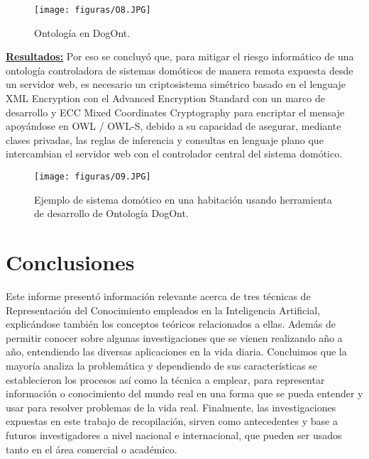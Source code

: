 \documentclass[10pt,conference]{IEEEtran}
\begin{document}
\begin{enumerate}
\begin{figure}[H]
 \begin{center}
       \texttt{[image: figuras/O8.JPG]}
      \caption{Ontología en DogOnt.}
      \label{fO8} 
      \end{center}
\end{figure}
\textbf{\underline{Resultados:}}
Por eso se concluyó que, para mitigar el riesgo informático de una ontología controladora de sistemas domóticos de manera remota expuesta desde un servidor web, es necesario un criptosistema simétrico basado en el lenguaje XML Encryption con el Advanced Encryption Standard con un marco de desarrollo y ECC Mixed Coordinates Cryptography para encriptar el mensaje apoyándose en OWL / OWL-S, debido a su capacidad de asegurar, mediante clases privadas, las reglas de inferencia y consultas en lenguaje plano que intercambian el servidor web con el controlador central del sistema domótico.

\begin{figure}[H]
 \begin{center}
       \texttt{[image: figuras/O9.JPG]}
      \caption{Ejemplo de sistema domótico en una habitación usando herramienta de desarrollo de Ontología DogOnt.}
      \label{fO9} 
      \end{center}
\end{figure}

\end{enumerate}


\section{\textbf{Conclusiones}}

Este informe presentó información relevante acerca de tres técnicas de Representación del Conocimiento empleados en la Inteligencia Artificial, explicándose también los conceptos teóricos relacionados a ellas. Además de permitir conocer sobre algunas investigaciones que se vienen realizando año a año, entendiendo las diversas aplicaciones en la vida diaria. Concluimos que la mayoría analiza la problemática y dependiendo de sus características se establecieron los procesos así como la técnica a emplear, para representar información o conocimiento del mundo real en una forma que se pueda entender y usar para resolver problemas de la vida real. Finalmente, las investigaciones expuestas en este trabajo de recopilación, sirven como antecedentes y base a futuros investigadores a nivel nacional e internacional, que pueden ser usados tanto en el área comercial o académico.
\medskip

\end{document}
